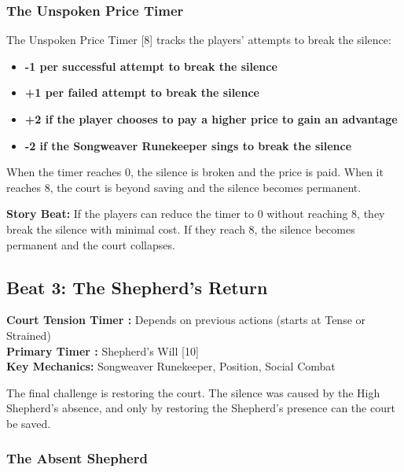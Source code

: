 \documentclass{article}
\begin{document}
\subsubsection{The Unspoken Price Timer }

The Unspoken Price Timer [8] tracks the players' attempts to break the silence:

\begin{itemize}
    \item \textbf{-1 per successful attempt to break the silence}
    \item \textbf{+1 per failed attempt to break the silence}
    \item \textbf{+2 if the player chooses to pay a higher price to gain an advantage}
    \item \textbf{-2 if the Songweaver Runekeeper sings to break the silence}
\end{itemize}

When the timer reaches 0, the silence is broken and the price is paid. When it reaches 8, the court is beyond saving and the silence becomes permanent.

\begin{storybox}
\textbf{Story Beat:} If the players can reduce the timer to 0 without reaching 8, they break the silence with minimal cost. If they reach 8, the silence becomes permanent and the court collapses.
\end{storybox}

\subsection{Beat 3: The Shepherd's Return}

\begin{mechanicbox}
\textbf{Court Tension Timer :} Depends on previous actions (starts at Tense or Strained) \\
\textbf{Primary Timer :} Shepherd's Will [10] \\
\textbf{Key Mechanics:} Songweaver Runekeeper, Position, Social Combat
\end{mechanicbox}

The final challenge is restoring the court. The silence was caused by the High Shepherd's absence, and only by restoring the Shepherd's presence can the court be saved.

\subsubsection{The Absent Shepherd}
\end{document}
